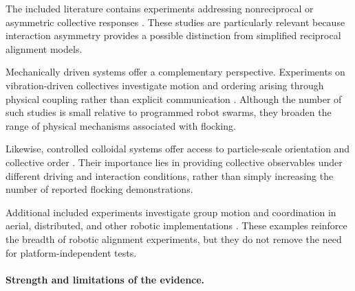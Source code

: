 The included literature contains experiments
addressing nonreciprocal or asymmetric
collective responses
\cite{Fruchart2022nonreciprocalphase,Buerle2020formationofstable,Chen2022collectiveresponse,Lffler2023collectiveforaging,Jianchao2024emergentchiralitya,Luo2025flockingphasesepar,Casiulis2025ageometricconditio}.
These studies are particularly relevant
because interaction asymmetry provides
a possible distinction from simplified
reciprocal alignment models.



Mechanically driven systems offer
a complementary perspective.
Experiments on vibration-driven
collectives investigate motion
and ordering arising through
physical coupling rather than
explicit communication
\cite{Welch2019activereorientation,Deblais2018boundariescontrolc,Escobar2025effectofparticlec,Boudet2021fromcollectionsof}.
Although the number of such
studies is small relative to
programmed robot swarms,
they broaden the range of
physical mechanisms associated
with flocking.

Likewise, controlled colloidal
systems offer access to
particle-scale orientation
and collective order
\cite{Chen2024synchronousandfull,Buerle2020formationofstable,Lffler2023collectiveforaging,Chen2022collectiveresponse}.
Their importance lies in
providing collective observables
under different driving
and interaction conditions,
rather than simply increasing
the number of reported
flocking demonstrations.

Additional included experiments
investigate group motion and
coordination in aerial,
distributed, and other
robotic implementations
\cite{Zhou2021synchronizedswimmin,Beaver2022aconstraintdriven,Amorim2024aminimalistic3dse,Rezeck2021flockingsegregative,Albani2022distributedthreedi,Fernando2021onlineflockingcont,Brandsttter2023multiagentspatial,Brandstatter2024flockformationcont,Yu2024grfbasedpredictive,Amorim2021selforganizeduavf,Cioarg2010evaluationoffishs,Fine2011flockingdontneed,Hauert2011reynoldsflockingin,nr2023onboardpredictivef,Iacone2024decentralizedaccele,Wang2022optiswarmopticals,Abpeikar2025adualtaskdeeprei,Zhang2026noiseresilientimpl,Wang2026t2rswarmtransferr}.
These examples reinforce the breadth
of robotic alignment experiments,
but they do not remove the need
for platform-independent tests.

\paragraph*{Strength and limitations of the evidence.}

